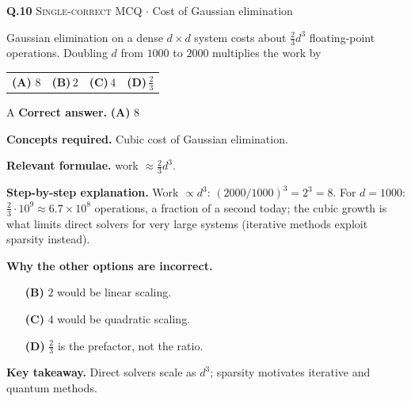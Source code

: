 \documentclass[11pt,a4paper]{article}
\newcommand{\optlabel}[1]{\textbf{(#1)}}
\newcommand{\correctlabel}[1]{\textcolor{okgreen}{\textbf{(#1)}\,\ding{51}}}
\newenvironment{qitem}[1]{\begin{list}{}{\setlength{\leftmargin}{3.3em}\setlength{\labelwidth}{3.1em}%
  \setlength{\labelsep}{0.2em}\setlength{\topsep}{3pt}\setlength{\parsep}{3pt}}\item[\textbf{Q.#1}\hfill]}{\end{list}}
\newcommand{\qsep}{\par\vspace{2pt}{\color{black!15}\hrule}\vspace{4pt}}
\newcommand{\qmeta}[2]{{\footnotesize\color{black!60}\textsc{#1} \;$\cdot$\; #2}\par}
\begin{document}
\begin{qitem}{10}
\qmeta{Single-correct MCQ}{Cost of Gaussian elimination}
Gaussian elimination on a dense $d\times d$ system costs about $\tfrac23d^3$ floating-point operations. Doubling $d$ from $1000$ to $2000$ multiplies the work by
\par\smallskip\noindent\begin{tabularx}{\linewidth}{@{}*{4}{L}@{}}
\correctlabel{A}\,$8$ & \optlabel{B}\,$2$ & \optlabel{C}\,$4$ & \optlabel{D}\,$\tfrac23$
\end{tabularx}
\end{qitem}
\begin{solbox}{A}
\textbf{\color{brand}Correct answer.} \textcolor{okgreen}{\textbf{(A)}} $8$

\textbf{\color{brand}Concepts required.} Cubic cost of Gaussian elimination.

\textbf{\color{brand}Relevant formulae.} work $\approx\frac23d^3$.

\textbf{\color{brand}Step-by-step explanation.} Work $\propto d^3$: $(2000/1000)^3 = 2^3 = 8$. For $d = 1000$: $\tfrac23\cdot10^9 \approx 6.7\times10^8$ operations, a fraction of a second today; the cubic growth is what
limits direct solvers for very large systems (iterative methods exploit sparsity instead).

\textbf{\color{brand}Why the other options are incorrect.}
\begin{itemize}[leftmargin=2.4em, itemsep=1pt, topsep=2pt]
\item[\textbf{(B)}] $2$ would be linear scaling.
\item[\textbf{(C)}] $4$ would be quadratic scaling.
\item[\textbf{(D)}] $\frac23$ is the prefactor, not the ratio.
\end{itemize}
\textbf{\color{brand}Key takeaway.} Direct solvers scale as $d^3$; sparsity motivates iterative and quantum methods.
\end{solbox}
\qsep
\end{document}

